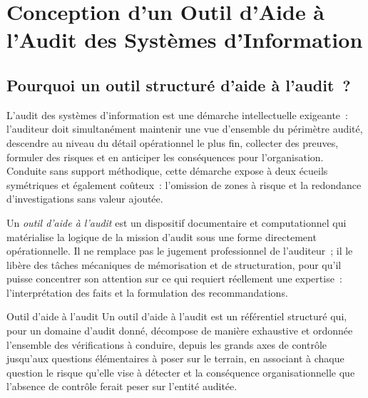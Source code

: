 
\chapter{Conception d'un Outil d'Aide à l'Audit des Systèmes d'Information}
\label{chap:06_outil_aide_audit}

\section{Pourquoi un outil structuré d'aide à l'audit~?}
\label{sec:pourquoi}

L'audit des systèmes d'information est une démarche intellectuelle exigeante~:
l'auditeur doit simultanément maintenir une vue d'ensemble du périmètre audité,
descendre au niveau du détail opérationnel le plus fin, collecter des preuves,
formuler des risques et en anticiper les conséquences pour l'organisation.
Conduite sans support méthodique, cette démarche expose à deux écueils
symétriques et également coûteux~: l'omission de zones à risque et la
redondance d'investigations sans valeur ajoutée.

Un \emph{outil d'aide à l'audit} est un dispositif documentaire et
computationnel qui matérialise la logique de la mission d'audit sous une forme
directement opérationnelle. Il ne remplace pas le jugement professionnel de
l'auditeur~; il le libère des tâches mécaniques de mémorisation et de
structuration, pour qu'il puisse concentrer son attention sur ce qui requiert
réellement une expertise~: l'interprétation des faits et la formulation des
recommandations.

\begin{boxdef}{Outil d'aide à l'audit}
Un outil d'aide à l'audit est un référentiel structuré qui, pour un domaine
d'audit donné, décompose de manière exhaustive et ordonnée l'ensemble des
vérifications à conduire, depuis les grands axes de contrôle jusqu'aux questions
élémentaires à poser sur le terrain, en associant à chaque question le risque
qu'elle vise à détecter et la conséquence organisationnelle que l'absence de
contrôle ferait peser sur l'entité auditée.
\end{boxdef}

